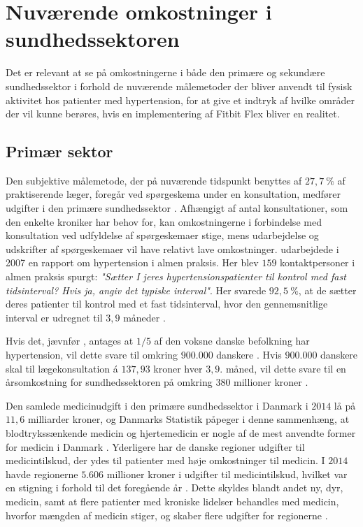 \section{Nuværende omkostninger i sundhedssektoren}
Det er relevant at se på omkostningerne i både den primære og sekundære sundhedssektor i forhold de nuværende målemetoder der bliver anvendt til fysisk aktivitet hos patienter med hypertension, for at give et indtryk af hvilke områder der vil kunne berøres, hvis en implementering af Fitbit Flex bliver en realitet. 

\subsection{Primær sektor} \label{sec:nuv_primaer}
\label{sec:primaer_sektor_omkostninger}
Den subjektive målemetode, der på nuværende tidspunkt benyttes af $27,7~\%$ af praktiserende læger, foregår ved spørgeskema under en konsultation, medfører udgifter i den primære sundhedssektor \citep{munck2007}. Afhængigt af antal konsultationer, som den enkelte kroniker har behov for, kan omkostningerne i forbindelse med konsultation ved udfyldelse af spørgeskemaer stige, mens udarbejdelse og udskrifter af spørgeskemaer vil have relativt lave omkostninger.
\citeauthor{munck2007} udarbejdede i 2007 en rapport om hypertension i almen praksis. Her blev $159$ kontaktpersoner i almen praksis spurgt: \textit{"Sætter I jeres hypertensionspatienter til kontrol med fast tidsinterval? Hvis ja, angiv det typiske interval"}. Her svarede $92,5~\%$, at de sætter deres patienter til kontrol med et fast tidsinterval, hvor den gennemsnitlige interval er udregnet til $3,9$ måneder \citep{munck2007}. 

Hvis det, jævnfør \citeauthor{kronborg2008}, antages at $1/5$ af den voksne danske befolkning har hypertension, vil dette svare til omkring $900.000$ danskere \citep{folketal2016}. Hvis $900.000$ danskere skal til lægekonsultation á $137,93$ kroner hver $3,9$. måned, vil dette svare til en årsomkostning for sundhedssektoren på omkring $380$ millioner kroner \citep{honorartabel2016}. 

Den samlede medicinudgift i den primære sundhedssektor i Danmark i $2014$ lå på $11,6$ milliarder kroner, og Danmarks Statistik påpeger i denne sammenhæng, at blodtrykssænkende medicin og hjertemedicin er nogle af de mest anvendte former for medicin i Danmark \citep{dst2016}. Yderligere har de danske regioner udgifter til medicintilskud, der ydes til patienter med høje omkostninger til medicin. I $2014$ havde regionerne $5.606$ millioner kroner i udgifter til medicintilskud, hvilket var en stigning i forhold til det foregående år \citep{medicinoekonomi2015}. Dette skyldes blandt andet ny, dyr, medicin, samt at flere patienter med kroniske lidelser behandles med medicin, hvorfor mængden af medicin stiger, og skaber flere udgifter for regionerne \citep{regioner2015}. 

